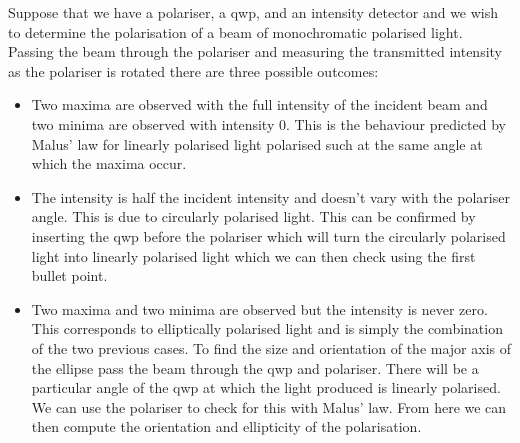     Suppose that we have a polariser, a \gls{qwp}, and an intensity detector and we wish to determine the polarisation of a beam of monochromatic polarised light.
    Passing the beam through the polariser and measuring the transmitted intensity as the polariser is rotated there are three possible outcomes:
    \begin{itemize}
        \item Two maxima are observed with the full intensity of the incident beam and two minima are observed with intensity 0.
        This is the behaviour predicted by Malus' law for linearly polarised light polarised such at the same angle at which the maxima occur.
        
        \item The intensity is half the incident intensity and doesn't vary with the polariser angle.
        This is due to circularly polarised light.
        This can be confirmed by inserting the \gls{qwp} before the polariser which will turn the circularly polarised light into linearly polarised light which we can then check using the first bullet point.
        
        \item Two maxima and two minima are observed but the intensity is never zero.
        This corresponds to elliptically polarised light and is simply the combination of the two previous cases.
        To find the size and orientation of the major axis of the ellipse pass the beam through the \gls{qwp} and polariser.
        There will be a particular angle of the \gls{qwp} at which the light produced is linearly polarised.
        We can use the polariser to check for this with Malus' law.
        From here we can then compute the orientation and ellipticity of the polarisation.
    \end{itemize}